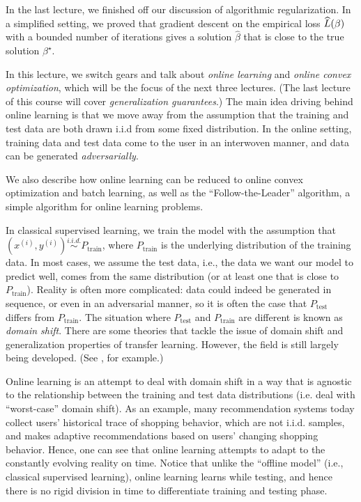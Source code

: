 \setcounter{section}{0}



In the last lecture, we finished off our discussion of algorithmic regularization. In a simplified setting, we proved that gradient descent on the empirical loss $\widehat{L}(\beta)$ with a bounded number of iterations gives a solution $\widehat\beta$ that is close to the true solution $\beta^\star$.

In this lecture, we switch gears and talk about \textit{online learning} and \textit{online convex optimization}, which will be the focus of the next three lectures. (The last lecture of this course will cover \textit{generalization guarantees}.) The main idea driving behind online learning is that we move away from the assumption that  the training and test data are both drawn i.i.d from some fixed distribution. In the online setting, training data and test data come to the user in an interwoven manner, and data can be generated \textit{adversarially}. 

We also describe how online learning can be reduced to online convex optimization and batch learning, as well as the ``Follow-the-Leader'' algorithm, a simple algorithm for online learning problems.


In classical supervised learning, we train the model with the assumption that $(x^{(i)}, y^{(i)}) \overset{i.i.d.}{\sim} P_{\text{train}}$, where $P_{\text{train}}$ is the underlying distribution of the training data. In most cases, we assume the test data, i.e., the data we want our model to predict well, comes from the same distribution (or at least one that is close to $P_{\text{train}}$). Reality is often more complicated: data could indeed be generated in sequence, or even in an adversarial manner, so it is often the case that $P_\text{test}$ differs from $P_\text{train}$. The situation where $P_\text{test}$ and $P_{\text{train}}$ are different is known as \textit{domain shift}. There are some theories that tackle the issue of domain shift and generalization properties of transfer learning. However, the field is still largely being developed. (See \cite{ben2007analysis}, for example.)

Online learning is an attempt to deal with domain shift in a way that is agnostic to the relationship between the training and test data distributions (i.e. deal with ``worst-case'' domain shift). As an example, many recommendation systems today collect users' historical trace of shopping behavior, which are not i.i.d. samples, and makes adaptive recommendations based on users' changing shopping behavior. Hence, one can see that online learning attempts to adapt to the constantly evolving reality on time. Notice that unlike the ``offline model'' (i.e., classical supervised learning), online learning learns while testing, and hence there is no rigid division in time to differentiate training and testing phase.

